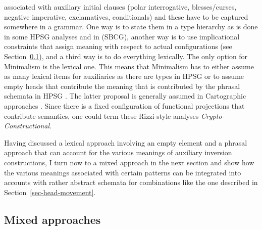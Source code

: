 \documentclass[output=paper]{langsci/langscibook}
\begin{document}
associated with auxiliary initial clauses (polar interrogative, blesses/curses, negative imperative,
exclamatives, conditionals) and these have to be captured somewhere in a grammar. One
way is to state them in a type hierarchy as is done in some HPSG analyses and in \sbcg (SBCG), another way
is to use implicational constraints that assign meaning with respect to actual configurations
(see Section~\ref{sec-mixed-approaches}), and a third way is to do everything lexically. The only option for
Minimalism is the lexical one. This means that Minimalism has to either assume as many lexical items
for auxiliaries as there are types in HPSG or to assume empty heads that contribute the meaning that
is contributed by the phrasal schemata in HPSG
\parencites[Section~5]{Borsley2006a}{BM2018Minimalism}. 
The latter proposal is generally assumed in
Cartographic approaches \citep{Rizzi97a-u}. Since there is a fixed configuration of functional projections
that contribute semantics, one could term these Rizzi-style analyses \emph{Crypto-Constructional}.

Having discussed a lexical approach involving an empty element and a phrasal approach that can
account for the various meanings of auxiliary inversion constructions, I turn now to a mixed
approach in the next section and show how the various meanings associated with certain patterns can
be integrated into accounts with rather abstract schemata for combinations like the one described in
Section~\ref{sec-head-movement}.

\subsection{Mixed approaches}
\label{sec-mixed-approaches}
\end{document}
